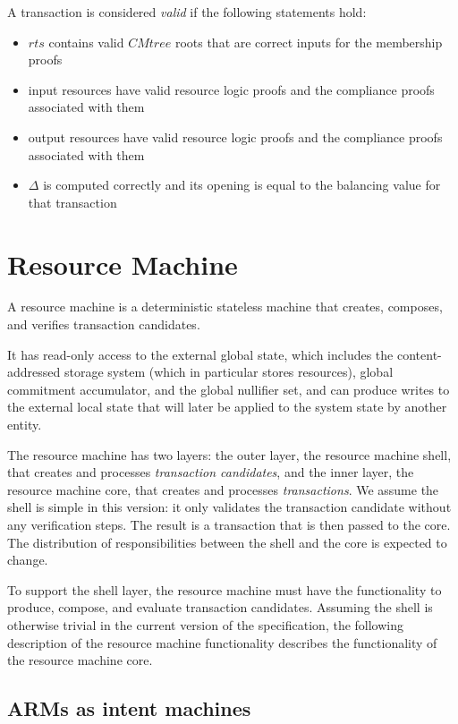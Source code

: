 \documentclass[
    11pt,            %
    techreport,        %
    affiltop,       %
]{art}
\begin{document}
A transaction is considered \textit{valid} if the following statements hold:
\begin{itemize}
    \item $rts$ contains valid $CMtree$ roots that are correct inputs for the membership proofs
    \item input resources have valid resource logic proofs and the compliance proofs associated with them
    \item output resources have valid resource logic proofs and the compliance proofs associated with them
    \item $\Delta$ is computed correctly and its opening is equal to the balancing value for that transaction
\end{itemize}

\section{Resource Machine}

A resource machine is a deterministic stateless machine that creates, composes, and verifies transaction candidates. 

It has read-only access to the external global state, which includes the content-addressed storage system (which in particular stores resources), global commitment accumulator, and the global nullifier set, and can produce writes to the external local state that will later be applied to the system state by another entity.

The resource machine has two layers: the outer layer, the resource machine shell, that creates and processes \textit{transaction candidates}, and the inner layer, the resource machine core, that creates and processes \textit{transactions}. We assume the shell is simple in this version: it only validates the transaction candidate without any verification steps. The result is a transaction that is then passed to the core. The distribution of responsibilities between the shell and the core is expected to change.

To support the shell layer, the resource machine must have the functionality to produce, compose, and evaluate transaction candidates. Assuming the shell is otherwise trivial in the current version of the specification, the following description of the resource machine functionality describes the functionality of the resource machine core.

\subsection{ARMs as intent machines}
\end{document}
